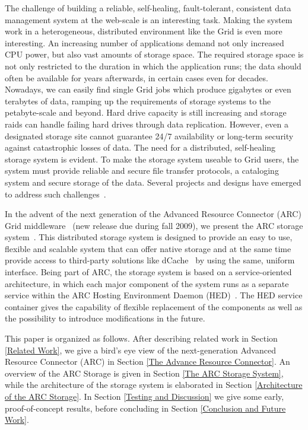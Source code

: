\documentclass[final]{ieee}
\begin{document}
The challenge of building a reliable, self-healing, fault-tolerant,
consistent data management system at the web-scale is an interesting
task. Making the system work in a heterogeneous, distributed
environment like the Grid is even more interesting. An increasing
number of applications demand not only increased CPU power, but also
vast amounts of storage space. The required storage space is not only
restricted to the duration in which the application runs; the data
should often be available for years afterwards, in certain cases even
for decades. Nowadays, we can easily find single Grid jobs which produce
gigabytes or even terabytes of data, ramping up the requirements of
storage systems to the petabyte-scale and beyond. Hard drive capacity is
still increasing and storage raids can handle failing hard drives through 
data replication. However, even a designated storage site cannot guarantee 
24/7 availability or long-term security against catastrophic losses of data. 
The need for a distributed, self-healing storage system is evident. To
make the storage system useable to Grid users, the system must provide
reliable and secure file transfer protocols, a cataloging system and
secure storage of the data. Several projects and designs have emerged
to address such challenges~\cite{Hoschek00datamanagement,DengWang}.

In the advent of the next generation of the Advanced Resource
Connector (ARC) Grid middleware~\cite{arc} (new release due during
fall 2009), we present the ARC storage
system~\cite{ARCStoragedesigndoc}. This distributed storage system is
designed to provide an easy to use, flexible and scalable system that
can offer native storage and at the same time provide access to
third-party solutions like dCache~\cite{dCache,DSSWithdCache} by using
the same, uniform interface. Being part of ARC, the storage system is
based on a service-oriented architecture, in which each major
component of the system runs as a separate service within the ARC
Hosting Environment Daemon (HED)~\cite{HEDdesigndoc}. The HED service
container gives the capability of flexible replacement of the
components as well as the possibility to introduce modifications in
the future. %

This paper is organized as follows. After describing
related work in Section \ref{Related Work}, we give a bird's eye
view of the next-generation Advanced Resource Connector (ARC) in
Section \ref{The Advance Resource Connector}. An overview of the
ARC Storage is given in Section \ref{The ARC Storage System}, while
the architecture of the storage system is elaborated in Section
\ref{Architecture of the ARC Storage}. In Section \ref{Testing and
  Discussion} we give some early, proof-of-concept results, before 
concluding in Section \ref{Conclusion and Future Work}. 
\end{document}
